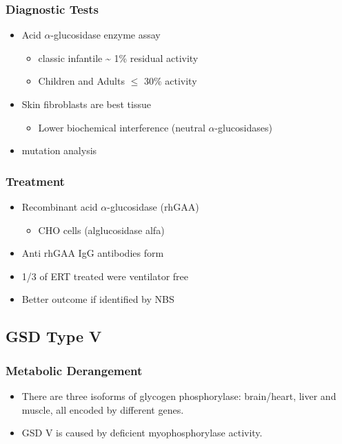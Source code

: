 \documentclass{scrartcl}
\begin{document}
\subsubsection{Diagnostic Tests}
\label{sec:org923bddb}
\begin{itemize}
\item Acid \(\alpha\)-glucosidase enzyme assay
\begin{itemize}
\item classic infantile \textasciitilde{} 1\% residual activity
\item Children and Adults \(\le\) 30\% activity
\end{itemize}
\item Skin fibroblasts are best tissue
\begin{itemize}
\item Lower biochemical interference (neutral \(\alpha\)-glucosidases)
\end{itemize}
\item mutation analysis
\end{itemize}
\subsubsection{Treatment}
\label{sec:org8323411}
\begin{itemize}
\item Recombinant acid \(\alpha\)-glucosidase (rhGAA)
\begin{itemize}
\item CHO cells (alglucosidase alfa)
\end{itemize}
\item Anti rhGAA IgG antibodies form
\item 1/3 of ERT treated were ventilator free
\item Better outcome if identified by NBS
\end{itemize}

\subsection{GSD Type V}
\label{sec:org59a74cb}
\subsubsection{Metabolic Derangement}
\label{sec:orgd78bfd3}
\begin{itemize}
\item There are three isoforms of glycogen phosphorylase: brain/heart,
liver and muscle, all encoded by different genes.
\item GSD V is caused by deficient myophosphorylase activity.
\end{itemize}
\end{document}
